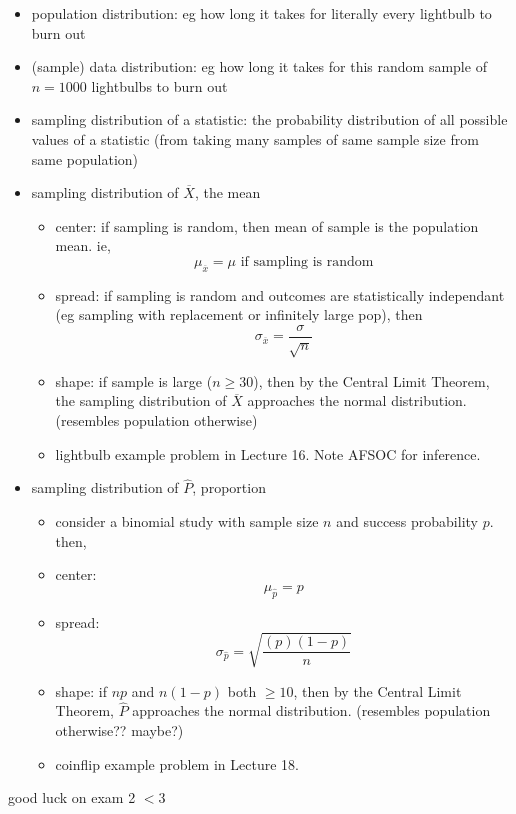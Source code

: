 \documentclass[11pt]{article}
\begin{document}
\begin{itemize}
  \item population distribution: eg how long it takes for literally every lightbulb to burn out
  \item (sample) data distribution: eg how long it takes for this random sample of  $n=1000$ lightbulbs to burn out
  \item sampling distribution of a statistic: the probability distribution of all possible values of a statistic (from taking many samples of same sample size from same population)
  \item sampling distribution of $\overline{X}$, the mean
  \begin{itemize}
    \item center: if sampling is random, then mean of sample is the population mean. ie,
    \[ \mu_{\overline{x}} = \mu \text{ if sampling is random}\]
    \item spread: if sampling is random and outcomes are statistically independant (eg sampling with replacement or infinitely large pop), then 
    \[ \sigma_{\overline{x}}=\frac{\sigma}{\sqrt{n}} \]
    \item shape: if sample is large ($n\ge 30$), then by the Central Limit Theorem, the sampling distribution of $\overline{X}$ approaches the normal distribution. (resembles population otherwise)
    \item lightbulb example problem in Lecture 16. Note AFSOC for inference.
  \end{itemize}
  \item sampling distribution of $\hat{P}$, proportion
  \begin{itemize}
    \item consider a binomial study with sample size $n$ and success probability $p$. then,
    \item center: 
    \[ \mu_{\hat{p}} = p \]
    \item spread: 
    \[ \sigma_{\hat{p}} = \sqrt{\frac{(p)(1-p)}{n}} \]
    \item shape: if $np$ and $n(1-p)$ both $\ge 10$, then by the Central Limit Theorem, $\hat{P}$ approaches the normal distribution. (resembles population otherwise?? maybe?)
    \item coinflip example problem in Lecture 18.
  \end{itemize}
\end{itemize}
good luck on exam 2 $<$3

\end{document}

